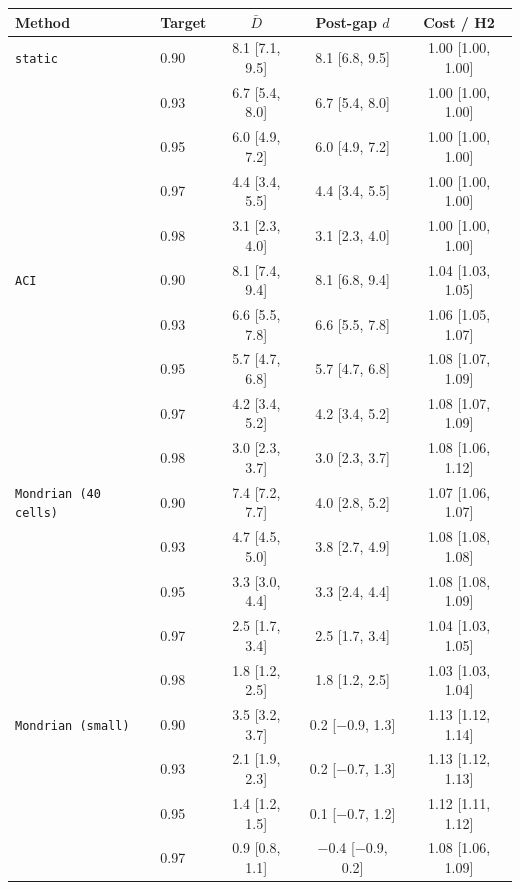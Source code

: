 \begin{tabular}{@{}llccc@{}}
\toprule
Method & Target & $\bar{D}$ & Post-gap $d$ & Cost / H2 \\
\midrule
\texttt{static} & 0.90 & 8.1 [7.1, 9.5] & 8.1 [6.8, 9.5] & 1.00 [1.00, 1.00] \\
 & 0.93 & 6.7 [5.4, 8.0] & 6.7 [5.4, 8.0] & 1.00 [1.00, 1.00] \\
 & 0.95 & 6.0 [4.9, 7.2] & 6.0 [4.9, 7.2] & 1.00 [1.00, 1.00] \\
 & 0.97 & 4.4 [3.4, 5.5] & 4.4 [3.4, 5.5] & 1.00 [1.00, 1.00] \\
 & 0.98 & 3.1 [2.3, 4.0] & 3.1 [2.3, 4.0] & 1.00 [1.00, 1.00] \\
\addlinespace
\texttt{ACI} & 0.90 & 8.1 [7.4, 9.4] & 8.1 [6.8, 9.4] & 1.04 [1.03, 1.05] \\
 & 0.93 & 6.6 [5.5, 7.8] & 6.6 [5.5, 7.8] & 1.06 [1.05, 1.07] \\
 & 0.95 & 5.7 [4.7, 6.8] & 5.7 [4.7, 6.8] & 1.08 [1.07, 1.09] \\
 & 0.97 & 4.2 [3.4, 5.2] & 4.2 [3.4, 5.2] & 1.08 [1.07, 1.09] \\
 & 0.98 & 3.0 [2.3, 3.7] & 3.0 [2.3, 3.7] & 1.08 [1.06, 1.12] \\
\addlinespace
\texttt{Mondrian (40 cells)} & 0.90 & 7.4 [7.2, 7.7] & 4.0 [2.8, 5.2] & 1.07 [1.06, 1.07] \\
 & 0.93 & 4.7 [4.5, 5.0] & 3.8 [2.7, 4.9] & 1.08 [1.08, 1.08] \\
 & 0.95 & 3.3 [3.0, 4.4] & 3.3 [2.4, 4.4] & 1.08 [1.08, 1.09] \\
 & 0.97 & 2.5 [1.7, 3.4] & 2.5 [1.7, 3.4] & 1.04 [1.03, 1.05] \\
 & 0.98 & 1.8 [1.2, 2.5] & 1.8 [1.2, 2.5] & 1.03 [1.03, 1.04] \\
\addlinespace
\texttt{Mondrian (small)} & 0.90 & 3.5 [3.2, 3.7] & 0.2 [$-$0.9, 1.3] & 1.13 [1.12, 1.14] \\
 & 0.93 & 2.1 [1.9, 2.3] & 0.2 [$-$0.7, 1.3] & 1.13 [1.12, 1.13] \\
 & 0.95 & 1.4 [1.2, 1.5] & 0.1 [$-$0.7, 1.2] & 1.12 [1.11, 1.12] \\
 & 0.97 & 0.9 [0.8, 1.1] & $-$0.4 [$-$0.9, 0.2] & 1.08 [1.06, 1.09] \\

\end{tabular}
